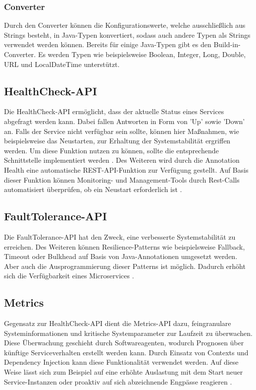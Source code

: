 \subsubsection{Converter}
Durch den Converter können die Konfigurationswerte, welche ausschließlich aus Strings besteht, in Java-Typen konvertiert, sodass auch andere Typen als Strings verwendet werden können. Bereits für einige Java-Typen gibt es den Build-in-Converter. Es werden Typen wie beispielsweise Boolean, Integer, Long, Double, URL und LocalDateTime unterstützt.

\subsection{HealthCheck-API} \label{healthcheck}
Die HealthCheck-API ermöglicht, dass der aktuelle Status eines Services abgefragt werden kann. Dabei fallen Antworten in Form von 'Up' sowie 'Down' an. Falls der Service nicht verfügbar sein sollte, können hier Maßnahmen, wie beispielsweise das Neustarten, zur Erhaltung der Systemstabilität ergriffen werden. Um diese Funktion nutzen zu können, sollte die entsprechende Schnittstelle implementiert werden \cite{LarsRowekamp.2017}. Des Weiteren wird durch die Annotation \@ Health eine automatische REST-API-Funktion zur Verfügung gestellt. Auf Basis dieser Funktion können Monitoring- und Management-Tools durch Rest-Calls automatisiert überprüfen, ob ein Neustart erforderlich ist \cite{LarsRowekamp.2017c}.  

\subsection{FaultTolerance-API} \label{faulttolerance}
Die FaultTolerance-API hat den Zweck, eine verbesserte Systemstabilität zu erreichen. Des Weiteren können Resilience-Patterns wie beispielsweise Fallback, Timeout oder Bulkhead auf Basis von Java-Annotationen umgesetzt werden. Aber auch die Ausprogrammierung dieser Patterns ist möglich. Dadurch erhöht sich die Verfügbarkeit eines Microservices \cite{ibm.2017}.

\subsection{Metrics}
Gegensatz zur HealthCheck-API dient die Metrics-API dazu, feingranulare Systeminformationen und kritische Systemparameter zur Laufzeit zu überwachen. Diese Überwachung geschieht durch Softwareagenten, wodurch Prognosen über künftige Serviceverhalten erstellt werden kann. Durch Einsatz von Contexts und Dependency Injection kann diese Funktionalität verwendet werden. Auf diese Weise lässt sich zum Beispiel auf eine erhöhte Auslastung mit dem Start neuer Service-Instanzen oder proaktiv auf sich abzeichnende Engpässe reagieren \cite{LarsRowekamp.2017c}. 

